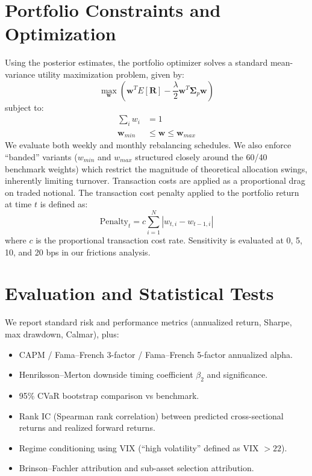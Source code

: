 \documentclass[12pt]{report}
\begin{document}
\section{Portfolio Constraints and Optimization}
Using the posterior estimates, the portfolio optimizer solves a standard mean-variance utility maximization problem, given by:
\begin{equation}
    \max_{\mathbf{w}} \left( \mathbf{w}^T E[\mathbf{R}] - \frac{\lambda}{2} \mathbf{w}^T \mathbf{\Sigma}_p \mathbf{w} \right)
\end{equation}
subject to:
\begin{align}
    \sum_i w_i       & = 1                                   \\
    \mathbf{w}_{min} & \leq \mathbf{w} \leq \mathbf{w}_{max}
\end{align}
We evaluate both weekly and monthly rebalancing schedules. We also enforce ``banded'' variants ($w_{min}$ and $w_{max}$ structured closely around the 60/40 benchmark weights) which restrict the magnitude of theoretical allocation swings, inherently limiting turnover.
Transaction costs are applied as a proportional drag on traded notional. The transaction cost penalty applied to the portfolio return at time $t$ is defined as:
\begin{equation}
    \text{Penalty}_t = c \sum_{i=1}^{N} |w_{t,i} - w_{t-1,i}|
\end{equation}
where $c$ is the proportional transaction cost rate. Sensitivity is evaluated at 0, 5, 10, and 20 bps in our frictions analysis.

\section{Evaluation and Statistical Tests}
We report standard risk and performance metrics (annualized return, Sharpe, max drawdown, Calmar), plus:
\begin{itemize}
    \item CAPM / Fama--French 3-factor / Fama--French 5-factor annualized alpha.
    \item Henriksson--Merton downside timing coefficient $\beta_2$ and significance.
    \item 95\% CVaR bootstrap comparison vs benchmark.
    \item Rank IC (Spearman rank correlation) between predicted cross-sectional returns and realized forward returns.
    \item Regime conditioning using VIX (``high volatility'' defined as VIX $> 22$).
    \item Brinson--Fachler attribution and sub-asset selection attribution.
\end{itemize}
\end{document}
